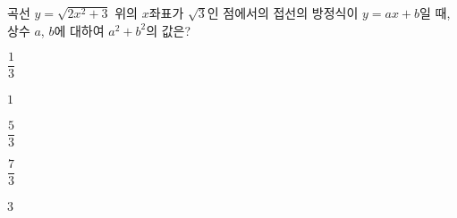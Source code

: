 곡선 $y=\sqrt{2x^2+3}$ 위의 $x$좌표가 $\sqrt{3}$인 점에서의 접선의 방정식이 $y=ax+b$일 때, 상수 $a$, $b$에 대하여 $a^2+b^2$의 값은?
\begin{choices32}{\rule[-3ex]{0pt}{8ex}$\dfrac{1}{3}$}{\rule[-3ex]{0pt}{8ex}$1$}{\rule[-3ex]{0pt}{8ex}$\dfrac{5}{3}$}{\rule[-3ex]{0pt}{8ex}$\dfrac{7}{3}$}{\rule[-3ex]{0pt}{8ex}$3$}\end{choices32}
